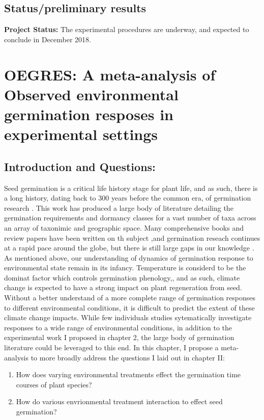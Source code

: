 \documentclass{article}\usepackage[]{graphicx}\usepackage[]{color}
\begin{document}
{{\subsection{Status/preliminary results}
\textbf{Project Status:} The experimental procedures are underway, and expected to conclude in December 2018.\\
\section*{OEGRES: A meta-analysis of Observed environmental germination resposes in experimental settings}
\subsection*{Introduction and Questions:}
\indent Seed germination is a critical life history stage for plant life, and as such, there is a long history, dating back to 300 years before the common era, of germination research \citep{Baskin_2014}. This work has produced a large body of literature detailing the germination requirements and dormancy classes for a vast number of taxa across an array of taxonimic and geographic space. Many comprehensive books and review papers have been written on th subject \citep*{},and germination reseach continues at a rapid pace around the globe, but there is still large gaps in our knowledge \citep{Baskin_2014}. As mentioned above, our understanding of  dynamics of germination response to environmental state remain in its infancy. Temperature is considerd to be the dominat factor which controls germination phenology,\citep{}, and as such, climate change is expected to have a strong impact on plant regeneration from seed. Without a better understand of a more complete range of germination responses to different environmental conditions, it is difficult to predict the extent of these climate change impacts. While few individuals studies sytematically investigate responses to a wide range of environmental conditions, in addition to the experimental work I proposed in chapter 2, the large body of germination literature could be leveraged to this end. In this chapter, I propose a meta-analysis to more broadly address the questions I laid out in chapter II:
\begin{enumerate}
\item How does varying environmental treatments effect the germination time courses of plant species?
\item How do various envrionmental treatment interaction to effect seed germination?

\end{enumerate}}}
\end{document}

